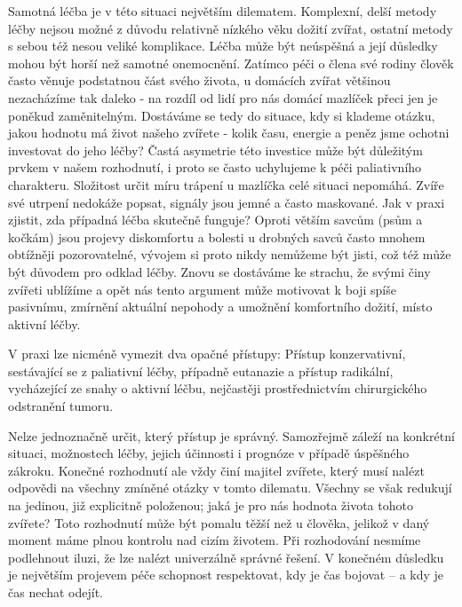 \documentclass[czech,11pt,a4paper]{article}
\begin{document}
	Samotná léčba je v této situaci největším dilematem. Komplexní, delší metody léčby nejsou možné z důvodu relativně nízkého věku dožití zvířat, ostatní metody s sebou též nesou veliké komplikace. Léčba může být neúspěšná a její důsledky mohou být horší než samotné onemocnění. Zatímco péči o člena své rodiny člověk často věnuje podstatnou část svého života, u domácích zvířat většinou nezacházíme tak daleko - na rozdíl od lidí pro nás domácí mazlíček přeci jen je poněkud zaměnitelným. Dostáváme se tedy do situace, kdy si klademe otázku, jakou hodnotu má život našeho zvířete - kolik času, energie a peněz jsme ochotni investovat do jeho léčby? Častá asymetrie této investice může být důležitým prvkem v našem rozhodnutí, i proto se často uchylujeme k péči paliativního charakteru. Složitost určit míru trápení u mazlíčka celé situaci nepomáhá. Zvíře své utrpení nedokáže popsat, signály jsou jemné a často maskované. Jak v praxi zjistit, zda případná léčba skutečně funguje? Oproti větším savcům (psům a kočkám) jsou projevy diskomfortu a bolesti u drobných savců často mnohem obtížněji pozorovatelné, vývojem si proto nikdy nemůžeme být jisti, což též může být důvodem pro odklad léčby. Znovu se dostáváme ke strachu, že svými činy zvířeti ublížíme a opět nás tento argument může motivovat k boji spíše pasivnímu, zmírnění aktuální nepohody a umožnění komfortního dožití, místo aktivní léčby.
	
	V praxi lze nicméně vymezit dva opačné přístupy: Přístup konzervativní, sestávající se z paliativní léčby, případně eutanazie a přístup radikální, vycházející ze snahy o aktivní léčbu, nejčastěji prostřednictvím chirurgického odstranění tumoru. 
	
	Nelze jednoznačně určit, který přístup je správný. Samozřejmě záleží na konkrétní situaci, možnostech léčby, jejich účinnosti i prognóze v případě úspěšného zákroku. Konečné rozhodnutí ale vždy činí majitel zvířete, který musí nalézt odpovědi na všechny zmíněné otázky v tomto dilematu. Všechny se však redukují na jedinou, již explicitně položenou; jaká je pro nás hodnota života tohoto zvířete? Toto rozhodnutí může být pomalu těžší než u člověka, jelikož v daný moment máme plnou kontrolu nad cizím životem. Při rozhodování nesmíme podlehnout iluzi, že lze nalézt univerzálně správné řešení. V konečném důsledku je největším projevem péče schopnost respektovat, kdy je čas bojovat – a kdy je čas nechat odejít.
	
	

		
	\printbibliography		
		
		
		
\end{document}

